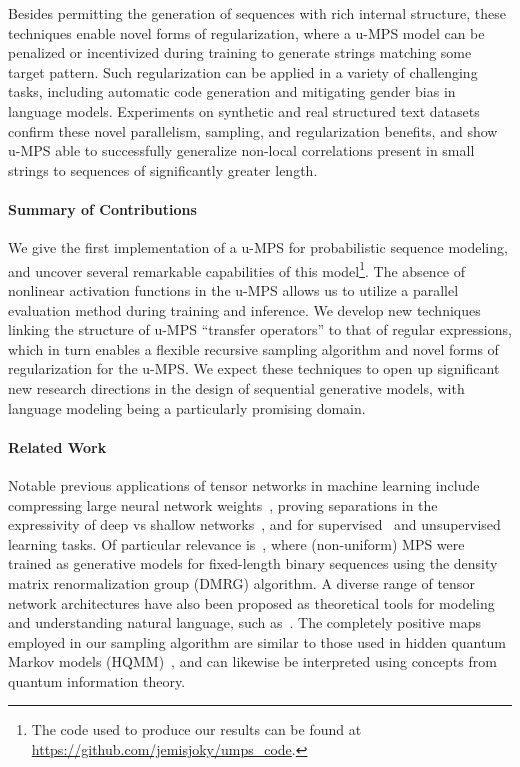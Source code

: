 Besides permitting the generation of sequences with rich internal structure, these techniques enable novel forms of regularization, where a u-MPS model can be penalized or incentivized during training to generate strings matching some target pattern. Such regularization can be applied in a variety of challenging tasks, including automatic code generation and mitigating gender bias in language models. Experiments on synthetic and real structured text datasets confirm these novel parallelism, sampling, and regularization benefits, and show u-MPS able to successfully generalize non-local correlations present in small strings to sequences of significantly greater length.

\paragraph{Summary of Contributions}
We give the first implementation of a u-MPS for probabilistic sequence modeling, and uncover several remarkable capabilities of this model\footnote{The code used to produce our results can be found at \url{https://github.com/jemisjoky/umps_code}.}. The absence of nonlinear activation functions in the u-MPS allows us to utilize a parallel evaluation method during training and inference. We develop new techniques linking the structure of u-MPS ``transfer operators'' to that of regular expressions, which in turn enables a flexible recursive sampling algorithm and novel forms of regularization for the u-MPS. We expect these techniques to open up significant new research directions in the design of sequential generative models, with language modeling being a particularly promising domain.

\paragraph{Related Work}
Notable previous applications of tensor networks in machine learning include compressing large neural network weights~\citep{novikov2015}, proving separations in the expressivity of deep vs shallow networks~\citep{cohen2016}, and for supervised~\citep{stoudenmire2016, novikov2017, glasser2018} and unsupervised~\citep{han2018, stoudenmire2018, cheng2019} learning tasks. Of particular relevance is~\citep{stokes2019}, where (non-uniform) MPS were trained as generative models for fixed-length binary sequences using the density matrix renormalization group (DMRG) algorithm. A diverse range of tensor network architectures have also been proposed as theoretical tools for modeling and understanding natural language, such as~\citep{pestun2017, coecke2010, gallego2017, degiuli2019}. The completely positive maps employed in our sampling algorithm are similar to those used in hidden quantum Markov models (HQMM)~\citep{monras2010,srinivasan2018}, and can likewise be interpreted using concepts from quantum information theory.

